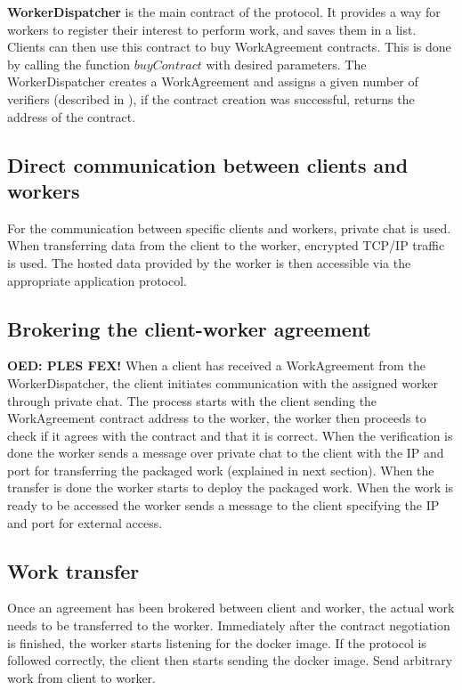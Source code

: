 \textbf{WorkerDispatcher} is the main contract of the protocol. It provides a way for workers to register their interest to perform work, and saves them in a list. Clients can then use this contract to buy WorkAgreement contracts. This is done by calling the function $buyContract$ with desired parameters. The WorkerDispatcher creates a WorkAgreement and assigns a given number of verifiers (described in ), if the contract creation was successful, returns the address of the contract.

\subsection{Direct communication between clients and workers}
For the communication between specific clients and workers, private chat is used. When transferring data from the client to the worker, encrypted TCP/IP traffic is used. The hosted data provided by the worker is then accessible via the appropriate application protocol.

\subsection{Brokering the client-worker agreement}
\label{sec:res:brokering}
{\huge\color{red}\textbf{OED: PLES FEX!}}
When a client has received a WorkAgreement from the WorkerDispatcher, the client initiates communication with the assigned worker through private chat. 
The process starts with the client sending the WorkAgreement contract address to the worker, the worker then proceeds to check if it agrees with the contract and that it is correct.
When the verification is done the worker sends a message over private chat to the client with the IP and port for transferring the packaged work (explained in next section). When the transfer is done the worker starts to deploy the packaged work. When the work is ready to be accessed the worker sends a message to the client specifying the IP and port for external access.

\subsection{Work transfer}
Once an agreement has been brokered between client and worker, the actual work needs to be transferred to the worker.
Immediately after the contract negotiation is finished, the worker starts listening for the docker image. If the protocol is followed correctly, the client then starts sending the docker image. 
Send arbitrary work from client to worker.

